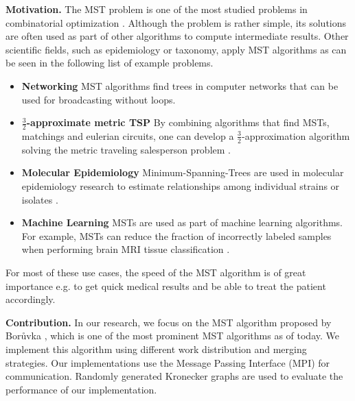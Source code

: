 \documentclass[letterpaper]{article}
\newcommand{\mypar}[1]{{\bf #1.}}
\begin{document}
\mypar{Motivation}
%
%
The MST problem is one of the most studied problems in combinatorial optimization \cite{graham1985history}. Although the
problem is rather simple, its solutions are often used as part of other algorithms to compute intermediate results.
Other scientific fields, such as epidemiology or taxonomy, apply MST algorithms as can be seen in the following list of
example problems.
\begin{itemize}
  \item \textbf{Networking} MST algorithms find trees in computer networks that can be used for broadcasting without
    loops. %
  \item \textbf{$\frac{3}{2}$-ap\-prox\-i\-mate metric TSP} By combining algorithms that find MSTs, matchings and
    eulerian circuits, one can develop a $\frac{3}{2}$-ap\-prox\-i\-mation algorithm solving the metric traveling
    salesperson problem \cite{christofides1976worst}.
  \item \textbf{Molecular Epidemiology} Minimum-Spanning-Trees are used in molecular epidemiology research to estimate
    relationships among individual strains or isolates \cite{spada2004use, salipante2011inadequacies}.
  \item \textbf{Machine Learning} MSTs are used as part of machine learning algorithms. For example, MSTs can reduce the
    fraction of incorrectly labeled samples when performing brain MRI tissue classification \cite{cocosco2003fully}.
\end{itemize}
For most of these use cases, the speed of the MST algorithm is of great importance e.g. to get quick medical results and
be able to treat the patient accordingly.

\mypar{Contribution}
In our research, we focus on the MST algorithm proposed by Bor\r{u}vka \cite{boruuvka1926jistem, nevsetvril2001otakar},
which is one of the most prominent MST algorithms as of today. We implement this algorithm using different work
distribution and merging strategies. Our implementations use the Message Passing Interface (MPI) for communication.
Randomly generated Kronecker graphs are used to evaluate the performance of our implementation.
\end{document}
